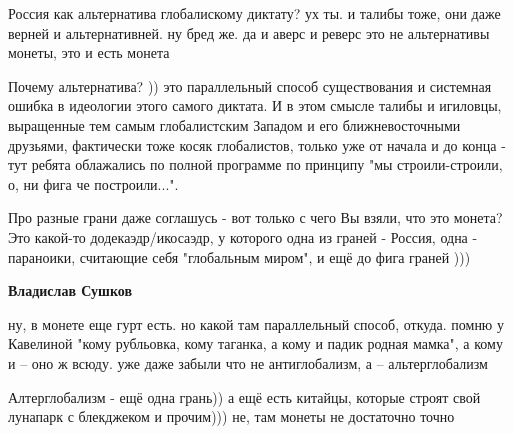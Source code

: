 \begin{itemize}
\begin{itemize}
Россия как альтернатива глобалискому диктату? ух ты.  и талибы тоже, они даже
верней и альтернативней. ну бред же. да и аверс и реверс это не альтернативы
монеты, это и есть монета

 

Почему альтернатива? )) это параллельный способ существования и системная
ошибка в идеологии этого самого диктата. И в этом смысле талибы и игиловцы,
выращенные тем самым глобалистским Западом и его ближневосточными друзьями,
фактически тоже косяк глобалистов, только уже от начала и до конца - тут ребята
облажались по полной программе по принципу "мы строили-строили, о, ни фига че
построили...".

Про разные грани даже соглашусь - вот только с чего Вы взяли, что это монета?
Это какой-то додекаэдр/икосаэдр, у которого одна из граней - Россия, одна -
параноики, считающие себя "глобальным миром", и ещё до фига граней )))


 
\textbf{Владислав Сушков} 

ну, в монете еще гурт есть. но какой там параллельный способ, откуда. помню у
Кавелиной "кому рубльовка, кому таганка, а кому и падик родная мамка", а кому и
– оно ж всюду. уже даже забыли что не антиглобализм, а – альтерглобализм

 
Алтерглобализм - ещё одна грань)) а ещё есть китайцы, которые строят свой лунапарк с блекджеком и прочим))) не, там монеты не достаточно точно

 

\end{itemize}
\end{itemize}
